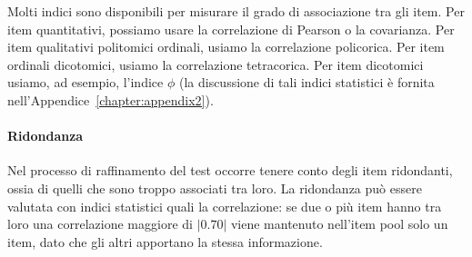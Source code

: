Molti indici sono disponibili per misurare il grado di associazione tra gli item. 
Per item quantitativi, possiamo usare la correlazione di Pearson o la covarianza. Per item qualitativi politomici ordinali, usiamo la correlazione policorica. Per item ordinali dicotomici, usiamo la correlazione tetracorica. Per item dicotomici usiamo, ad esempio, l'indice $\phi$ (la discussione di tali indici statistici è fornita nell'Appendice~\ref{chapter:appendix2}). 

\paragraph{Ridondanza}

Nel processo di raffinamento del test occorre tenere conto degli item ridondanti, ossia di quelli che sono troppo associati tra loro. La ridondanza può essere valutata con indici statistici quali la correlazione: se due o più item hanno tra loro una correlazione maggiore di $|0.70|$ viene mantenuto nell'item pool solo un item, dato che gli altri apportano la stessa informazione.



